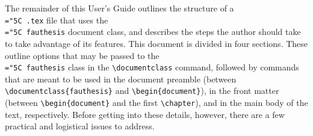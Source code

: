 \documentclass[11pt]{article}
\newcommand\code[1]{{\normalfont\texttt{\let\dv\textsl\chardef\\="5C #1}}}
\begin{document}
The remainder of this User's Guide outlines the structure of a \code{.tex} file that uses the \code{fauthesis} document class, and describes the steps the author should take to take advantage of its features.  This document is divided in four sections.  These outline options that may be passed to the \code{fauthesis} class in the \verb=\documentclass= command, followed by commands that are meant to be used in the document preamble (between \verb=\documentclass{fauthesis}= and \verb=\begin{document}=), in the front matter (between \verb=\begin{document}= and the first \verb=\chapter=), and in the main body of the text, respectively.  Before getting into these details, however, there are a few practical and logistical issues to address.
%
\end{document}
